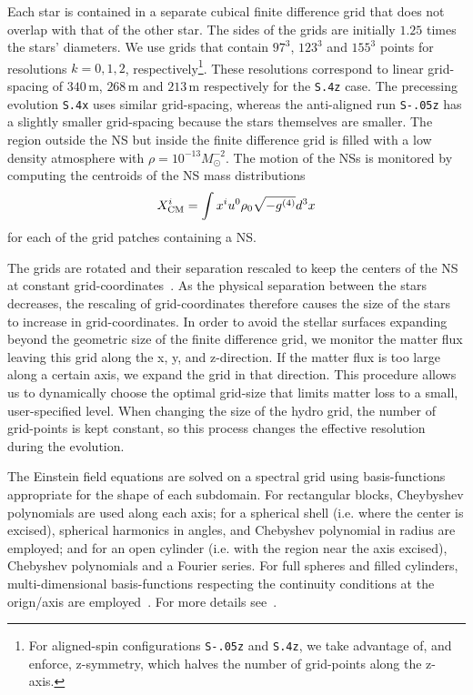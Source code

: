 Each star is contained in a separate cubical finite
difference grid that does not overlap with that
of the other star. The sides of the grids are initially $1.25$ times
the stars' diameters. We use grids that contain $97^3$, $123^3$ and
$155^3$ points for resolutions $k=0,1,2$, respectively\footnote{For
  aligned-spin configurations {\tt S-.05z} and {\tt S.4z}, we take advantage of,
  and enforce, z-symmetry, which halves the number of grid-points
  along the z-axis.}. These resolutions correspond to linear
grid-spacing of $340\,\text{m}$, $268\,\text{m}$ and $213\,\text{m}$
respectively for the {\tt S.4z} case. The precessing evolution {\tt S.4x} uses
similar grid-spacing, whereas the anti-aligned run {\tt S-.05z} has a
slightly smaller grid-spacing because the stars themselves are
smaller. The region outside the NS but inside the finite
difference grid is filled with a low density
atmosphere with $\rho=10^{-13}M_{\odot}^{-2}$. The motion of the NSs
is monitored by computing the centroids of the NS mass distributions
\begin{equation}
\label{eq:centroid}
X^i_{\rm CM} = \int{x^iu^0\rho_0\sqrt{-g^{(4)}}d^3x}
\end{equation}
for each of the grid patches containing a NS.

The grids are rotated and their separation rescaled to keep the
centers of the NS at constant grid-coordinates~\citep{Scheel2006,Hemberger:2012jz,Scheel2014}. As the physical separation between the stars decreases, the rescaling of
grid-coordinates therefore causes the size of the stars to increase
in grid-coordinates. In order to avoid the stellar surfaces expanding
beyond the geometric size of the finite difference grid, we monitor the matter flux leaving
this grid along the x, y, and z-direction. If the matter flux is too
large along a certain axis, we expand the grid in that
direction. 
This procedure allows us to
dynamically choose the optimal grid-size that limits matter loss to a
small, user-specified level. When changing the size of the hydro
grid, the number of grid-points is kept constant, so this process
changes the effective resolution during the evolution.

The Einstein field equations are solved on a spectral grid using basis-functions appropriate for the shape of each subdomain.
For rectangular blocks, Cheybyshev polynomials are used along each axis; for a spherical shell (i.e. where the center is excised), spherical harmonics in angles, and Chebyshev polynomial in radius are employed; and for an open cylinder (i.e. with the region near the axis excised), Chebyshev polynomials and a Fourier series. For full spheres and filled cylinders, multi-dimensional basis-functions respecting the continuity conditions at the orign/axis are employed~\citep{Matsushima-Marcus:1995,1997JCoPh.136..100V}. For more details see~\cite{Muhlberger2014}. 


